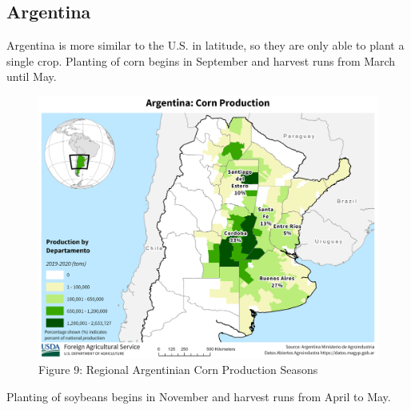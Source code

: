 \documentclass[
  letterpaper,
  DIV=11,
  numbers=noendperiod]{scrreprt}
\begin{document}
\hypertarget{argentina}{%
\subsection{Argentina}\label{argentina}}

Argentina is more similar to the U.S. in latitude, so they are only able
to plant a single crop. Planting of corn begins in September and harvest
runs from March until May.

\begin{figure}

{\centering \includegraphics{assets/Argentina_Departments_Corn.png}

}

\caption{Figure 9: Regional Argentinian Corn Production Seasons}

\end{figure}

Planting of soybeans begins in November and harvest runs from April to
May.
\end{document}
